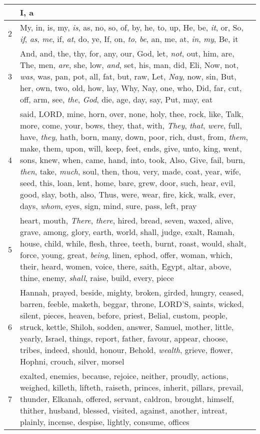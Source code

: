 \begin{longtable}{l|p{3.75in}}
\hline \hline
\endlastfoot
1 & I, a \\ \hline
2 & My, in, is, my, \emph{is}, as, no, so, of, by, he, to, up, He, be, \emph{it}, or, So, \emph{if}, \emph{as}, \emph{me}, if, \emph{at}, do, ye, If, on, \emph{to}, \emph{be}, an, me, at, \emph{in}, \emph{my}, Be, it \\ \hline
3 & And, and, the, thy, for, any, our, God, let, \emph{not}, out, him, are, The, men, \emph{are}, she, low, \emph{and}, set, his, man, did, Eli, Now, not, \emph{was}, was, pan, pot, all, fat, but, raw, Let, \emph{Nay}, now, sin, But, her, own, two, old, how, lay, Why, Nay, one, who, Did, far, cut, off, arm, see, \emph{the}, \emph{God}, die, age, day, say, Put, may, eat \\ \hline
4 & said, LORD, mine, horn, over, none, holy, thee, rock, like, Talk, more, come, your, bows, they, that, with, \emph{They}, \emph{that}, \emph{were}, full, have, \emph{they}, hath, born, many, down, poor, rich, dust, from, \emph{them}, make, them, upon, will, keep, feet, ends, give, unto, king, went, sons, knew, when, came, hand, into, took, Also, Give, fail, burn, \emph{then}, take, \emph{much}, soul, then, thou, very, made, coat, year, wife, seed, this, loan, lent, home, bare, grew, door, such, hear, evil, good, slay, both, also, Thus, were, wear, fire, kick, walk, ever, days, \emph{whom}, eyes, sign, mind, sure, pass, left, pray \\ \hline
5 & heart, mouth, \emph{There}, \emph{there}, hired, bread, seven, waxed, alive, grave, among, glory, earth, world, shall, judge, exalt, Ramah, house, child, while, flesh, three, teeth, burnt, roast, would, shalt, force, young, great, \emph{being}, linen, ephod, offer, woman, which, their, heard, women, voice, there, saith, Egypt, altar, above, thine, enemy, \emph{shall}, raise, build, every, piece \\ \hline
6 & Hannah, prayed, beside, mighty, broken, girded, hungry, ceased, barren, feeble, maketh, beggar, throne, LORD'S, saints, wicked, silent, pieces, heaven, before, priest, Belial, custom, people, struck, kettle, Shiloh, sodden, answer, Samuel, mother, little, yearly, Israel, things, report, father, favour, appear, choose, tribes, indeed, should, honour, Behold, \emph{wealth}, grieve, flower, Hophni, crouch, silver, morsel \\ \hline
7 & exalted, enemies, because, rejoice, neither, proudly, actions, weighed, killeth, lifteth, raiseth, princes, inherit, pillars, prevail, thunder, Elkanah, offered, servant, caldron, brought, himself, thither, husband, blessed, visited, against, another, intreat, plainly, incense, despise, lightly, consume, offices \\ \hline

\end{longtable}
